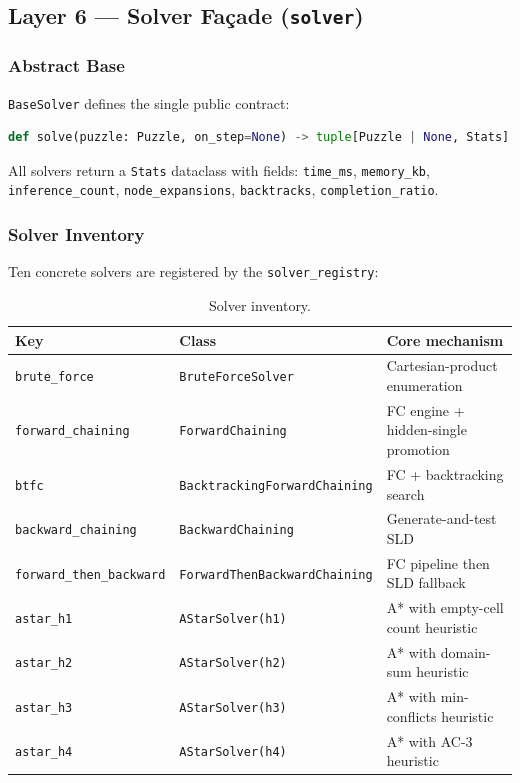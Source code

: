 \subsection{Layer 6 — Solver Façade (\texttt{solver})}
\label{sec:layer_solver}

\subsubsection{Abstract Base}

\texttt{BaseSolver} defines the single public contract:
\begin{lstlisting}[language=Python]
def solve(puzzle: Puzzle, on_step=None) -> tuple[Puzzle | None, Stats]
\end{lstlisting}
All solvers return a \texttt{Stats} dataclass with fields:
\texttt{time\_ms}, \texttt{memory\_kb}, \texttt{inference\_count},
\texttt{node\_expansions}, \texttt{backtracks}, \texttt{completion\_ratio}.

\subsubsection{Solver Inventory}

Ten concrete solvers are registered by the \texttt{solver\_registry}:

\begin{table}[h]
  \centering
  \caption{Solver inventory.}
  \label{tab:solvers}
  \begin{tabular}{lll}
    \toprule
    Key & Class & Core mechanism \\
    \midrule
    \texttt{brute\_force}           & \texttt{BruteForceSolver}               & Cartesian-product enumeration \\
    \texttt{forward\_chaining}      & \texttt{ForwardChaining}                & FC engine + hidden-single promotion \\
    \texttt{btfc}                   & \texttt{BacktrackingForwardChaining}    & FC + backtracking search \\
    \texttt{backward\_chaining}     & \texttt{BackwardChaining}               & Generate-and-test SLD \\
    \texttt{forward\_then\_backward}& \texttt{ForwardThenBackwardChaining}    & FC pipeline then SLD fallback \\
    \texttt{astar\_h1}              & \texttt{AStarSolver(h1)}                & A* with empty-cell count heuristic \\
    \texttt{astar\_h2}              & \texttt{AStarSolver(h2)}                & A* with domain-sum heuristic \\
    \texttt{astar\_h3}              & \texttt{AStarSolver(h3)}                & A* with min-conflicts heuristic \\
    \texttt{astar\_h4}              & \texttt{AStarSolver(h4)}                & A* with AC-3 heuristic \\
    \bottomrule
  \end{tabular}
\end{table}

